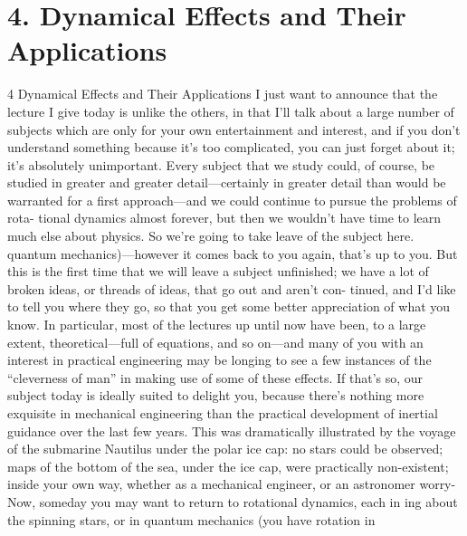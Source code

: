 \documentclass[10pt,oneside]{article}
\begin{document}
\section*{4. Dynamical Effects and Their Applications}
\label{tips-sec-12-4-dynamical-effects-and-their-applications}
4 Dynamical Effects and Their Applications I just want to announce that the lecture I give today is unlike the others, in that I’ll talk about a large number of subjects which are only for your own entertainment and interest, and if you don’t understand something because it’s too complicated, you can just forget about it; it’s absolutely unimportant. Every subject that we study could, of course, be studied in greater and greater detail---certainly in greater detail than would be warranted for a first approach---and we could continue to pursue the problems of rota- tional dynamics almost forever, but then we wouldn’t have time to learn much else about physics. So we’re going to take leave of the subject here. quantum mechanics)---however it comes back to you again, that’s up to you. But this is the first time that we will leave a subject unfinished; we have a lot of broken ideas, or threads of ideas, that go out and aren’t con- tinued, and I’d like to tell you where they go, so that you get some better appreciation of what you know. In particular, most of the lectures up until now have been, to a large extent, theoretical---full of equations, and so on---and many of you with an interest in practical engineering may be longing to see a few instances of the “cleverness of man” in making use of some of these effects. If that’s so, our subject today is ideally suited to delight you, because there’s nothing more exquisite in mechanical engineering than the practical development of inertial guidance over the last few years. This was dramatically illustrated by the voyage of the submarine Nautilus under the polar ice cap: no stars could be observed; maps of the bottom of the sea, under the ice cap, were practically non-existent; inside your own way, whether as a mechanical engineer, or an astronomer worry- Now, someday you may want to return to rotational dynamics, each in ing about the spinning stars, or in quantum mechanics (you have rotation in\par
\end{document}
